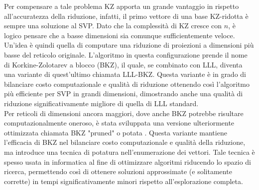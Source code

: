 Per compensare a tale problema KZ apporta un 
grande vantaggio in rispetto all'accuratezza della riduzione, infatti, il primo vettore
di una base KZ-ridotta è sempre una soluzione al SVP. Dato che la complessità di KZ
cresce con $n$, è logico pensare che a basse dimensioni sia comunque sufficientemente
veloce. Un'idea è quindi quella di computare
una riduzione di proiezioni a dimensioni più basse del reticolo originale.
L'algoritmo in questa configurazione prende il nome di Korkine-Zolotarev a blocco (BKZ), 
il quale, se combinato con LLL, diventa una variante di quest'ultimo chiamata LLL-BKZ. Questa
variante è in grado di bilanciare costo computazionale e qualità di riduzione ottenendo così
l'algoritmo più efficiente per SVP in grandi dimensioni, dimostrando anche una qualità di riduzione
significativamente migliore di quella di LLL standard. \\

Per reticoli di dimensioni ancora maggiori, dove anche BKZ potrebbe risultare computazionalmente oneroso, 
è stata sviluppata una versione ulteriormente ottimizzata chiamata BKZ "pruned" o potata \cite{BKZPRUNED}. Questa variante 
mantiene l'efficacia di BKZ nel bilanciare costo computazionale e qualità della riduzione, 
ma introduce una tecnica di potatura nell'enumerazione dei vettori. Tale tecnica è spesso usata in 
informatica al fine di ottimizzare algoritmi riducendo lo spazio di ricerca, permettendo così di ottenere 
soluzioni approssimate (e solitamente corrette) in tempi significativamente minori rispetto all'esplorazione completa.